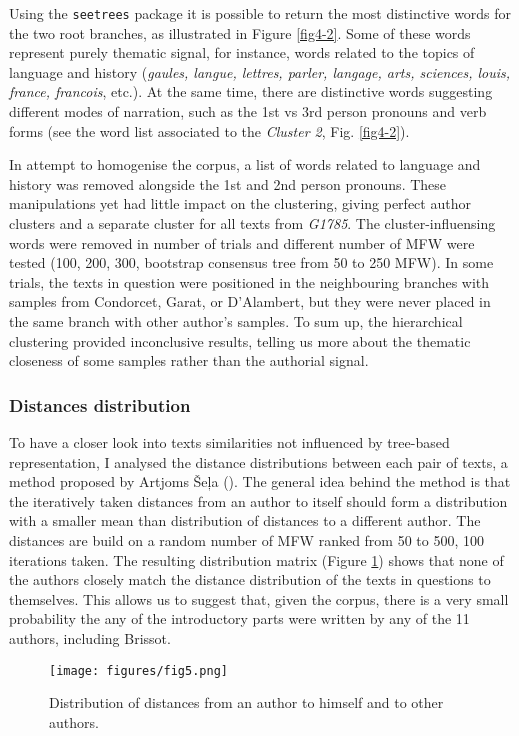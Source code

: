 \documentclass[12pt, letterpaper]{article}
\begin{document}
Using the \verb|seetrees| package it is possible to return the most distinctive words for the two root branches, as illustrated in Figure \ref{fig4-2}. Some of these words represent purely thematic signal, for instance, words related to the topics of language and history (\emph{gaules, langue, lettres, parler, langage, arts, sciences, louis, france, francois}, etc.). At the same time, there are distinctive words suggesting different modes of narration, such as the 1st vs 3rd person pronouns and verb forms (see the word list associated to the \emph{Cluster 2}, Fig. \ref{fig4-2}).

In attempt to homogenise the corpus, a list of words related to language and history was removed alongside the 1st and 2nd person pronouns. These manipulations yet had little impact on the clustering, giving perfect author clusters and a separate cluster for all texts from \emph{G1785}. The cluster-influensing words were removed in number of trials and different number of MFW were tested (100, 200, 300, bootstrap consensus tree from 50 to 250 MFW). In some trials, the texts in question were positioned in the neighbouring branches with samples from Condorcet, Garat, or D'Alambert, but they were never placed in the same branch with other author's samples. To sum up, the hierarchical clustering provided inconclusive results, telling us more about the thematic closeness of some samples rather than the authorial signal.

\subsubsection{Distances distribution}
To have a closer look into texts similarities not influenced by tree-based representation, I analysed the distance distributions between each pair of texts, a method proposed by Artjoms Šeļa (\cite{sela_navalny_r_2023}). The general idea behind the method is that the iteratively taken distances from an author to itself should form a distribution with a smaller mean than distribution of distances to a different author. The distances are build on a random number of MFW ranked from 50 to 500, 100 iterations taken. The resulting distribution matrix (Figure \ref{fig5}) shows that none of the authors closely match the distance distribution of the texts in questions to themselves. This allows us to suggest that, given the corpus, there is a very small probability the any of the introductory parts were written by any of the 11 authors, including Brissot.

\begin{figure}
    \centering
    \texttt{[image: figures/fig5.png]}
    \caption{Distribution of distances from an author to himself and to other authors.}
    \label{fig5}
\end{figure}
\end{document}
